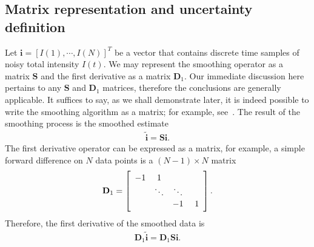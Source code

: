 \documentclass[twocolumn]{aastex631}
\begin{document}
\subsection{Matrix representation and uncertainty definition} \label{sec:unc_def}
Let $\mathbf{i}=[I(1),\cdots,I(N)]^T$ be a vector that contains discrete time samples of noisy total intensity $I(t)$. We may represent the smoothing operator as a matrix $\mathbf{S}$ and the first derivative as a matrix $\mathbf{D}_1$. Our immediate discussion here pertains to any $\mathbf{S}$ and $\mathbf{D}_1$ matrices, therefore the conclusions are generally applicable.  It suffices to say, as we shall demonstrate later, it is indeed possible to write the smoothing algorithm as a matrix; for example, see~\citet{Eilers_doi:10.1021/ac034173t, STICKEL2010467, Strang_wavelet}. The result of the smoothing process is the smoothed estimate
\begin{eqnarray}
\tilde{\mathbf{i}}=\mathbf{S}\mathbf{i}.
\label{eqn:smoothed}
\end{eqnarray}
The first derivative operator can be expressed as a matrix, for example, a simple forward difference on $N$ data points is a $(N-1) \times N$ matrix
\begin{eqnarray}
\mathbf{D}_1=
\left[ \begin{array}{c c c c} 
-1 & 1 &  &  \\ 
 & \ddots & \ddots & \\
   &   & -1 & ~1
\end{array} \right].
\label{eqn:D1}
\end{eqnarray}
Therefore, the first derivative of the smoothed data is 
\begin{eqnarray}
\mathbf{D}_1\tilde{\mathbf{i}}=\mathbf{D}_1\mathbf{S}\mathbf{i}.
\label{eqn:diff_smoothed}
\end{eqnarray}
\end{document}
